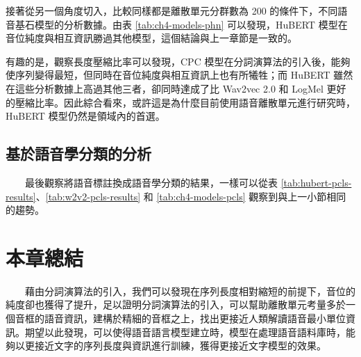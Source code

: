         接著從另一個角度切入，比較同樣都是離散單元分群數為 200 的條件下，不同語音基石模型的分析數據。由表 \ref{tab:ch4-models-phn} 可以發現，HuBERT 模型在音位純度與相互資訊勝過其他模型，這個結論與上一章節是一致的。

        有趣的是，觀察長度壓縮比率可以發現，CPC 模型在分詞演算法的引入後，能夠使序列變得最短，但同時在音位純度與相互資訊上也有所犧牲；而 HuBERT 雖然在這些分析數據上高過其他三者，卻同時達成了比 Wav2vec 2.0 和 LogMel 更好的壓縮比率。因此綜合看來，或許這是為什麼目前使用語音離散單元進行研究時，HuBERT 模型仍然是領域內的首選。



\subsection{基於語音學分類的分析}

　　最後觀察將語音標註換成語音學分類的結果，一樣可以從表 \ref{tab:hubert-pcls-results}、\ref{tab:w2v2-pcls-results} 和 \ref{tab:ch4-models-pcls} 觀察到與上一小節相同的趨勢。



\section{本章總結}

　　藉由分詞演算法的引入，我們可以發現在序列長度相對縮短的前提下，音位的純度卻也獲得了提升，足以證明分詞演算法的引入，可以幫助離散單元考量多於一個音框的語音資訊，建構於精細的音框之上，找出更接近人類解讀語音最小單位資訊。期望以此發現，可以使得語音語言模型建立時，模型在處理語音語料庫時，能夠以更接近文字的序列長度與資訊進行訓練，獲得更接近文字模型的效果。
